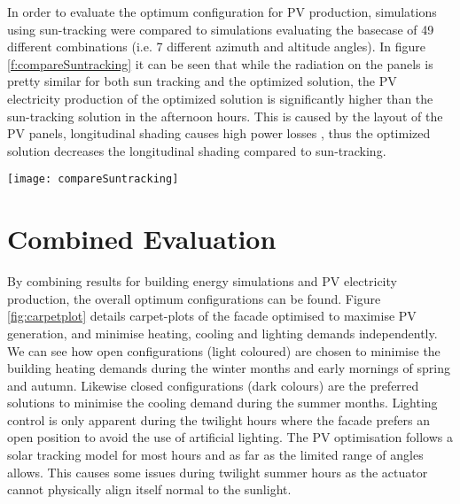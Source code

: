 		In order to evaluate the optimum configuration for PV production, simulations using sun-tracking were compared to simulations evaluating the basecase of 49 different combinations (i.e. 7 different azimuth and altitude angles). In figure \ref{f:compareSuntracking} it can be seen that while the radiation on the panels is pretty similar for both sun tracking and the optimized solution, the PV electricity production of the optimized solution is significantly higher than the sun-tracking solution in the afternoon hours. This is caused by the layout of the PV panels, longitudinal shading causes high power losses \cite{hofer2015PVSEC}, thus the optimized solution decreases the longitudinal shading compared to sun-tracking. 

		\begin{figure*}
			\begin{center}
			\texttt{[image: compareSuntracking]}
			\caption{Comparison of optimized solution to sun-tracking. a) average radiation on panels compared to radiation without shading b) PV electricity production comparison c) efficiency comparison}
			\label{f:compareSuntracking}
			\end{center}
		\end{figure*}




\section{Combined Evaluation}

	By combining results for building energy simulations and PV electricity production, the overall optimum configurations can be found. Figure \ref{fig:carpetplot} details carpet-plots of the facade optimised to maximise PV generation, and minimise heating, cooling and lighting demands independently. We can see how open configurations (light coloured) are chosen to minimise the building heating demands during the winter months and early mornings of spring and autumn. Likewise closed configurations (dark colours) are the preferred solutions to minimise the cooling demand during the summer months. Lighting control is only apparent during the twilight hours where the facade prefers an open position to avoid the use of artificial lighting. The PV optimisation follows a solar tracking model for most hours and as far as the limited range of angles allows. This causes some issues during twilight summer hours as the actuator cannot physically align itself normal to the sunlight. 




